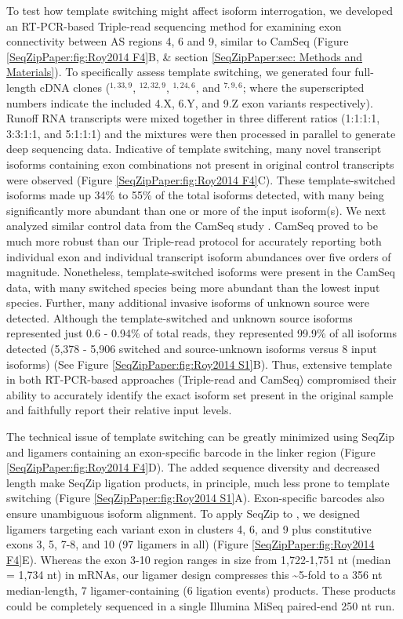 		To test how template switching might affect \dscam{} isoform interrogation, we developed an RT-PCR-based Triple-read sequencing method for examining exon connectivity between AS regions 4, 6 and 9, similar to CamSeq (Figure \ref{SeqZipPaper:fig:Roy2014 F4}B, \& section \ref{SeqZipPaper:sec: Methods and Materials}). To specifically assess template switching, we generated four full-length cDNA clones (\dscam{}$^{1,33,9}$, \dscam{}$^{12,32,9}$, \dscam{}$^{1,24,6}$, and \dscam$^{7,9,6}$; where the superscripted numbers indicate the included 4.X, 6.Y, and 9.Z exon variants respectively). Runoff RNA transcripts were mixed together in three different ratios (1:1:1:1, 3:3:1:1, and 5:1:1:1) and the mixtures were then processed in parallel to generate deep sequencing data. Indicative of template switching, many novel transcript isoforms containing exon combinations not present in original control transcripts were observed (Figure \ref{SeqZipPaper:fig:Roy2014 F4}C). These template-switched isoforms made up 34\% to 55\% of the total isoforms detected, with many being significantly more abundant than one or more of the input isoform(s). We next analyzed similar control data from the CamSeq study \citep{Sun2013}. CamSeq proved to be much more robust than our Triple-read protocol for accurately reporting both individual exon and individual transcript isoform abundances over five orders of magnitude. Nonetheless, template-switched isoforms were present in the CamSeq data, with many switched species being more abundant than the lowest input species. Further, many additional invasive isoforms of unknown source were detected. Although the template-switched and unknown source isoforms represented just 0.6 - 0.94\% of total reads, they represented 99.9\% of all isoforms detected (5,378 - 5,906 switched and source-unknown isoforms versus 8 input isoforms) (See Figure \ref{SeqZipPaper:fig:Roy2014 S1}B). Thus, extensive template in both RT-PCR-based approaches (Triple-read and CamSeq) compromised their ability to accurately identify the exact isoform set present in the original sample and faithfully report their relative input levels.

		The technical issue of template switching can be greatly minimized using SeqZip and ligamers containing an exon-specific barcode in the linker region (Figure \ref{SeqZipPaper:fig:Roy2014 F4}D). The added sequence diversity and decreased length make SeqZip ligation products, in principle, much less prone to template switching (Figure \ref{SeqZipPaper:fig:Roy2014 S1}A). Exon-specific barcodes also ensure unambiguous isoform alignment. To apply SeqZip to \dscam{}, we designed ligamers targeting each variant exon in clusters 4, 6, and 9 plus constitutive exons 3, 5, 7-8, and 10 (97 ligamers in all) (Figure \ref{SeqZipPaper:fig:Roy2014 F4}E). Whereas the exon 3-10 region ranges in size from 1,722-1,751 nt (median = 1,734 nt) in \dscam{} mRNAs, our ligamer design compresses this \textasciitilde 5-fold to a 356 nt median-length, 7 ligamer-containing (6 ligation events) products. These products could be completely sequenced in a single Illumina MiSeq paired-end 250 nt run.

